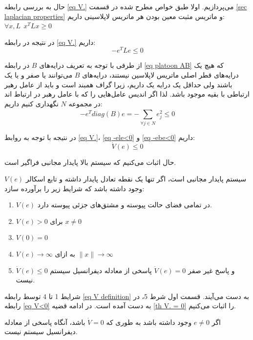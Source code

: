حال به بررسی رابطه \ref{eq V.} می‌پردازیم. اولا طبق خواص مطرح شده در قسمت \ref{sec laplacian properties} و ماتریس مثبت معین بودن هر ماتریس لاپلاسینی داریم:
$\forall x,L~~x^TLx \ge 0$
 
در نتیجه در رابطه \ref{eq V.} داریم:
\begin{equation}\label{eq -ele<0}
	-e^TLe \le 0
\end{equation}

از طرفی با توجه به تعریف درایه‌های $B$ در رابطه \ref{eq platoon AB} که هیچ‌ یک درایه‌های قطر اصلی ماتریس لاپلاسین نیستند، درایه‌های $B$ می‌توانند یا صفر و یا یک باشند ولی حداقل یک درایه یک داریم، زیرا گراف همبند است و باید از عامل رهبر ارتباطی با بقیه موجود باشد. لذا اگر اندیس عامل‌هایی را که با عامل رهبر در ارتباط اند در مجموعه $N$ نگهداری کنیم داریم:
\begin{equation}\label{eq -ebe<0}
	-e^Tdiag(B)e = -\sum_{\forall j \in N}^{}e^2_j \le 0
\end{equation}

در نتیجه با توجه به روابط \ref{eq V.}، \ref{eq -ele<0} و \ref{eq -ebe<0} داریم:
\begin{equation}\label{eq V<0}
	\dot{V}(e) \le 0
\end{equation}

حال اثبات می‌کنیم که سیستم بالا پایدار مجانبی فراگیر است.

\begin{theorem}\label{th g.a.stable}
سیستم پایدار مجانبی است، اگر تنها یک نقطه تعادل پایدار داشته و تابع اسکالر $V(e)$ وجود داشته باشد که شرایط زیر را برآورده سازد:
\begin{enumerate}
	\item $V(e)$ در تمامی فضای حالت پیوسته و مشتق‌های جزئی پیوسته دارد.
	\item $V(e) > 0$ برای $x \ne 0$
	\item $V(0) = 0$
	\item $V(e) \to \infty$ به ازای $\|x\| \to \infty$
	\item $\dot{V}(e) \le 0$
و پاسخ غیر صفر 
$\dot{V}(e) = 0$
پاسخی از معادله دیفرانسیل سیستم نیست.
\end{enumerate}
\end{theorem}

شرایط 1 تا 4 توسط رابطه \ref{eq V definition} به دست می‌آیند. قسمت اول شرط 5، در رابطه \ref{eq V<0}
به دست آمده است. در ادامه قضیه \ref{th V. = 0} را اثبات می‌کنیم.

\begin{theorem}\label{th V. = 0}
اگر $e \ne 0$ وجود داشته باشد به طوری که $\dot{V} = 0$ باشد، آنگاه پاسخی از معادله دیفرانسیل سیستم نیست.

\end{theorem}

